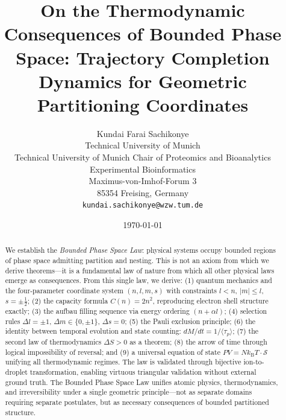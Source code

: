 \documentclass[twocolumn,10pt,a4paper]{article}
\theoremstyle{definition}
\theoremstyle{remark}
\newcommand{\kB}{k_{\mathrm{B}}}
\begin{document}
\title{\textbf{On the Thermodynamic Consequences of Bounded Phase Space: Trajectory Completion Dynamics for Geometric Partitioning Coordinates}}

\author{
Kundai Farai Sachikonye\\
Technical University of Munich\\
Technical University of Munich Chair of Proteomics and Bioanalytics \\
Experimental Bioinformatics \\
Maximus-von-Imhof-Forum 3\\
85354 Freising, Germany\\
\texttt{kundai.sachikonye@wzw.tum.de}
}

\date{\today}

\maketitle

\begin{abstract}
\noindent We establish the \emph{Bounded Phase Space Law}: physical systems occupy bounded regions of phase space admitting partition and nesting. This is not an axiom from which we derive theorems---it is a fundamental law of nature from which all other physical laws emerge as consequences. From this single law, we derive: (1) quantum mechanics and the four-parameter coordinate system $(n, l, m, s)$ with constraints $l < n$, $|m| \leq l$, $s = \pm\frac{1}{2}$; (2) the capacity formula $C(n) = 2n^2$, reproducing electron shell structure exactly; (3) the aufbau filling sequence via energy ordering $(n + \alpha l)$; (4) selection rules $\Delta l = \pm 1$, $\Delta m \in \{0, \pm 1\}$, $\Delta s = 0$; (5) the Pauli exclusion principle; (6) the identity between temporal evolution and state counting: $dM/dt = 1/\langle\tau_p\rangle$; (7) the second law of thermodynamics $\Delta S > 0$ as a theorem; (8) the arrow of time through logical impossibility of reversal; and (9) a universal equation of state $PV = N\kB T \cdot \mathcal{S}$ unifying all thermodynamic regimes. The law is validated through bijective ion-to-droplet transformation, enabling virtuous triangular validation without external ground truth. The Bounded Phase Space Law unifies atomic physics, thermodynamics, and irreversibility under a single geometric principle---not as separate domains requiring separate postulates, but as necessary consequences of bounded partitioned structure.
\end{abstract}
\end{document}
